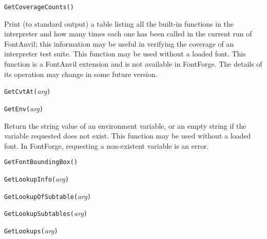 
\texttt{GetCoverageCounts()}

Print (to standard output) a table listing all the built-in functions in the
interpreter and how many times each one has been called in the current run
of FontAnvil; this information may be useful in verifying the coverage of an
interpreter test suite.
This function may be used without a loaded font.  This \FFdiff function is a
FontAnvil extension and is not available in FontForge.  The details of its
operation may change in some future version.



\texttt{GetCvtAt(}\textit{arg}\texttt{)}



\texttt{GetEnv(}\textit{arg}\texttt{)}

Return the string value of an environment variable, or an empty string if
the variable requested does not exist.
This function may be used without a loaded font.
In \FFdiff FontForge, requesting a non-existent variable is an error.



\texttt{GetFontBoundingBox(}\texttt{)}



\texttt{GetLookupInfo(}\textit{arg}\texttt{)}



\texttt{GetLookupOfSubtable(}\textit{arg}\texttt{)}



\texttt{GetLookupSubtables(}\textit{arg}\texttt{)}



\texttt{GetLookups(}\textit{arg}\texttt{)}



